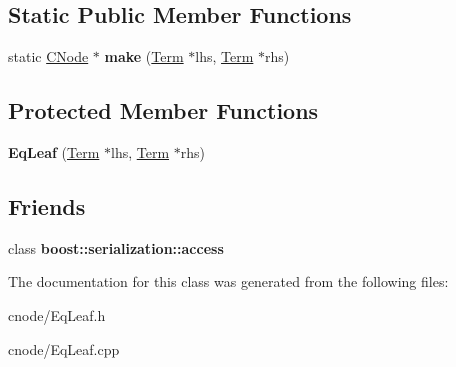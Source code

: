 \subsection*{\-Static \-Public \-Member \-Functions}
\begin{DoxyCompactItemize}
\item 
\hypertarget{classEqLeaf_a23f7147fcee3e80acef2e09e4f7096d0}{static \hyperlink{classCNode}{\-C\-Node} $\ast$ {\bfseries make} (\hyperlink{classTerm}{\-Term} $\ast$lhs, \hyperlink{classTerm}{\-Term} $\ast$rhs)}\label{classEqLeaf_a23f7147fcee3e80acef2e09e4f7096d0}

\end{DoxyCompactItemize}
\subsection*{\-Protected \-Member \-Functions}
\begin{DoxyCompactItemize}
\item 
\hypertarget{classEqLeaf_a2b43d9474fd748cb3254aca661b69e68}{{\bfseries \-Eq\-Leaf} (\hyperlink{classTerm}{\-Term} $\ast$lhs, \hyperlink{classTerm}{\-Term} $\ast$rhs)}\label{classEqLeaf_a2b43d9474fd748cb3254aca661b69e68}

\end{DoxyCompactItemize}
\subsection*{\-Friends}
\begin{DoxyCompactItemize}
\item 
\hypertarget{classEqLeaf_ac98d07dd8f7b70e16ccb9a01abf56b9c}{class {\bfseries boost\-::serialization\-::access}}\label{classEqLeaf_ac98d07dd8f7b70e16ccb9a01abf56b9c}

\end{DoxyCompactItemize}


\-The documentation for this class was generated from the following files\-:\begin{DoxyCompactItemize}
\item 
cnode/\-Eq\-Leaf.\-h\item 
cnode/\-Eq\-Leaf.\-cpp\end{DoxyCompactItemize}
